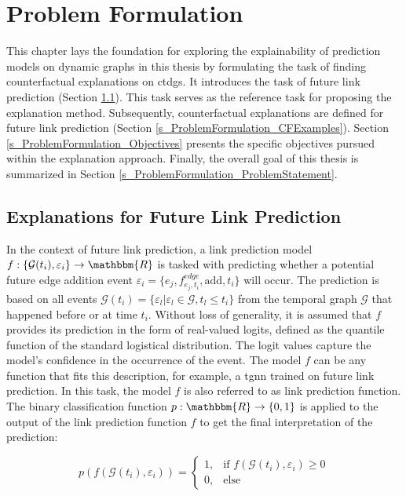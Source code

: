 \section{Problem Formulation}
\label{s_ProblemFormulation}

This chapter lays the foundation for exploring the explainability of prediction models on dynamic graphs in this thesis by formulating the task of finding counterfactual explanations on \glspl{ctdg}. It introduces the task of future link prediction (Section \ref{s_ProblemFormulation_Task}). This task serves as the reference task for proposing the explanation method. Subsequently, counterfactual explanations are defined for future link prediction (Section \ref{s_ProblemFormulation_CFExamples}). Section \ref{s_ProblemFormulation_Objectives} presents the specific objectives pursued within the explanation approach. Finally, the overall goal of this thesis is summarized in Section \ref{s_ProblemFormulation_ProblemStatement}.

\subsection{Explanations for Future Link Prediction}
\label{s_ProblemFormulation_Task}
In the context of future link prediction, a link prediction model $f: \{\mathcal{G}(t_i), \varepsilon_i\} \rightarrow \mathbbm{R}$ is tasked with predicting whether a potential future edge addition event $\varepsilon_{i} = \{e_j, f_{e_j, t_i}^{edge}, \mathrm{add}, t_i\}$ will occur. The prediction is based on all events $\mathcal{G}(t_i) = \{\varepsilon_{l} | \varepsilon_{l} \in \mathcal{G}, t_l \leq t_i\}$ from the temporal graph $\mathcal{G}$ that happened before or at time $t_i$. Without loss of generality, it is assumed that $f$ provides its prediction in the form of real-valued logits, defined as the quantile function of the standard logistical distribution. The logit values capture the model's confidence in the occurrence of the event. The model $f$ can be any function that fits this description, for example, a \gls{tgnn} trained on future link prediction. In this task, the model $f$ is also referred to as link prediction function. The binary classification function $p: \mathbbm{R} \rightarrow \{0, 1\}$ is applied to the output of the link prediction function $f$ to get the final interpretation of the prediction:

\begin{equation}
    p(f(\mathcal{G}(t_i), \varepsilon_{i})) = 
    \begin{cases}
    1,  &\text{if } f(\mathcal{G}(t_i), \varepsilon_{i}) \geq 0 \\
    0,  &\text{else}
    \end{cases}
\end{equation}

